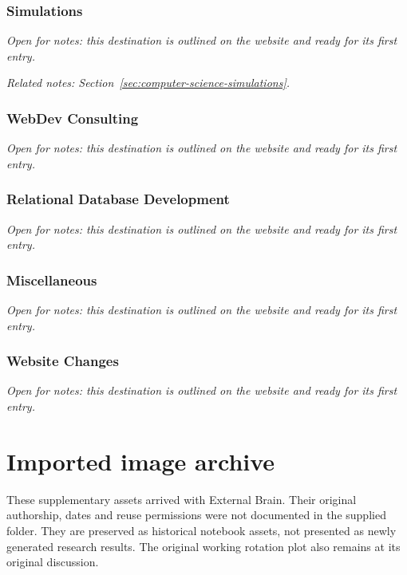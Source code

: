 \documentclass{article}
\begin{document}
\subsubsection{Simulations}\label{sec:coding-projects-simulations}
\textit{Open for notes: this destination is outlined on the website and ready for its first entry.}

\textit{Related notes: Section~\ref{sec:computer-science-simulations}.}

\subsubsection{WebDev Consulting}\label{sec:coding-projects-webdev-consulting}
\textit{Open for notes: this destination is outlined on the website and ready for its first entry.}

\subsubsection{Relational Database Development}\label{sec:relational-database-development}
\textit{Open for notes: this destination is outlined on the website and ready for its first entry.}

\subsubsection{Miscellaneous}\label{sec:miscellaneous}
\textit{Open for notes: this destination is outlined on the website and ready for its first entry.}

\subsubsection{Website Changes}\label{sec:website-changes}
\textit{Open for notes: this destination is outlined on the website and ready for its first entry.}

\section*{Imported image archive}
These supplementary assets arrived with External Brain. Their original authorship, dates and reuse permissions were not documented in the supplied folder. They are preserved as historical notebook assets, not presented as newly generated research results. The original working rotation plot also remains at its original discussion.
\end{document}
